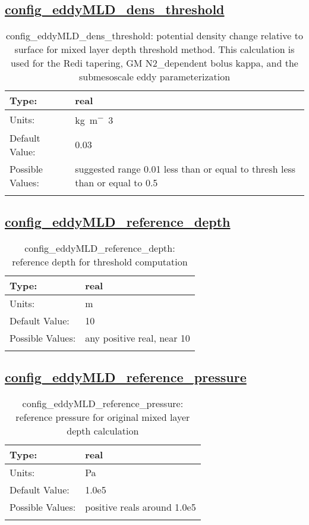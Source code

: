 \subsection[config\_eddyMLD\_dens\_threshold]{\hyperref[sec:nm_tab_eddy_parameterization]{config\_eddyMLD\_dens\_threshold}}
\label{subsec:nm_sec_config_eddyMLD_dens_threshold}
\begin{center}
\begin{longtable}{| p{2.0in} || p{4.0in} |}
    \hline
    Type: & real \\
    \hline
    Units: & \si{kg.m^-3} \\
    \hline
    Default Value: & 0.03 \\
    \hline
    Possible Values: & suggested range 0.01 less than or equal to thresh less than or equal to 0.5 \\
    \hline
    \caption{config\_eddyMLD\_dens\_threshold: potential density change relative to surface for mixed layer depth threshold method.  This calculation is used for the Redi tapering, GM N2\_dependent bolus kappa, and the submesoscale eddy parameterization}
\end{longtable}
\end{center}
\subsection[config\_eddyMLD\_reference\_depth]{\hyperref[sec:nm_tab_eddy_parameterization]{config\_eddyMLD\_reference\_depth}}
\label{subsec:nm_sec_config_eddyMLD_reference_depth}
\begin{center}
\begin{longtable}{| p{2.0in} || p{4.0in} |}
    \hline
    Type: & real \\
    \hline
    Units: & \si{m} \\
    \hline
    Default Value: & 10 \\
    \hline
    Possible Values: & any positive real, near 10 \\
    \hline
    \caption{config\_eddyMLD\_reference\_depth: reference depth for threshold computation}
\end{longtable}
\end{center}
\subsection[config\_eddyMLD\_reference\_pressure]{\hyperref[sec:nm_tab_eddy_parameterization]{config\_eddyMLD\_reference\_pressure}}
\label{subsec:nm_sec_config_eddyMLD_reference_pressure}
\begin{center}
\begin{longtable}{| p{2.0in} || p{4.0in} |}
    \hline
    Type: & real \\
    \hline
    Units: & \si{Pa} \\
    \hline
    Default Value: & 1.0e5 \\
    \hline
    Possible Values: & positive reals around 1.0e5 \\
    \hline
    \caption{config\_eddyMLD\_reference\_pressure: reference pressure for original mixed layer depth calculation}
\end{longtable}
\end{center}

